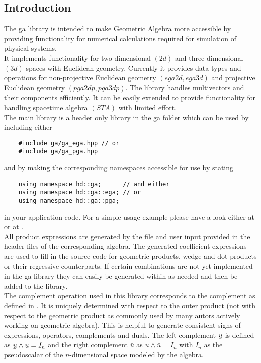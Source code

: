 \subsection{Introduction}
\label{intro}

The ga library is intended to make Geometric Algebra more accessible by providing
functionality for numerical calculations required for simulation of physical systems.
\\

It implements functionality for two-dimensional $(2d)$ and three-dimensional $(3d)$ spaces
with Euclidean geometry. Currently it provides data types and operations for
non-projective Euclidean geometry $(ega2d, ega3d)$ and projective Euclidean geometry
$(pga2dp, pga3dp)$. The library handles multivectors and their components efficiently. It
can be easily extended to provide functionality for handling spacetime algebra $(STA)$
with limited effort.
\\

The main library is a header only library in the ga folder which can be used by including
either
\begin{verbatim}
    #include ga/ga_ega.hpp // or
    #include ga/ga_pga.hpp
\end{verbatim}
and by making the corresponding namespaces accessible for use by stating
\begin{verbatim}
    using namespace hd::ga;      // and either
    using namespace hd::ga::ega; // or
    using namespace hd::ga::pga;
\end{verbatim}
in your application code. For a simple usage example please have a look either at
 or at .
\\

All product expressions are generated by the file  and
user input provided in the header files of the corresponding algebra. The generated
coefficient expressions are used to fill-in the source code for geometric products, wedge
and dot products or their regressive counterparts. If certain combinations are not yet
implemented in the ga library they can easily be generated within  as
needed and then be added to the library. \\

The complement operation used in this library corresponds to the complement as defined in
\cite{Lengyel_pga-illuminated:2024}. It is uniquely determined with respect to the outer
product (not with respect to the geometric product as commonly used by many autors
actively working on geometric algebra). This is helpful to generate consistent signs of
expressions, operators, complements and duals. The left complement $\ubar{u}$ is defined
as $\ubar{u} \wedge u = I_n$ and the right complement $\bar{u}$ as $u \wedge \bar{u} =
I_n$ with $I_n$ as the pseudoscalar of the $n$-dimensional space modeled by the algebra.
\\

